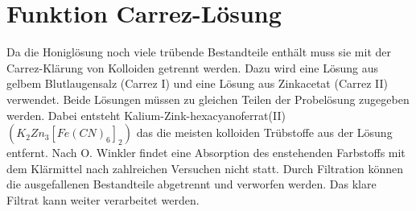 \section{Funktion Carrez-Lösung}
Da die Honiglösung noch viele trübende Bestandteile enthält muss sie mit der Carrez-Klärung von Kolloiden getrennt werden. Dazu wird eine Lösung aus gelbem Blutlaugensalz (Carrez I) und eine Lösung aus Zinkacetat (Carrez II) verwendet. Beide Lösungen müssen zu gleichen Teilen der Probelösung zugegeben werden. Dabei entsteht Kalium-Zink-hexacyanoferrat(II) $(K_{2}Zn_{3}[Fe(CN)_{6}]_{2})$ das die meisten kolloiden Trübstoffe aus der Lösung entfernt. Nach O. Winkler findet eine Absorption des enstehenden Farbstoffs mit dem Klärmittel nach zahlreichen Versuchen nicht statt. Durch Filtration können die ausgefallenen Bestandteile abgetrennt und verworfen werden. Das klare Filtrat kann weiter verarbeitet werden. \cite{Winkler} %

